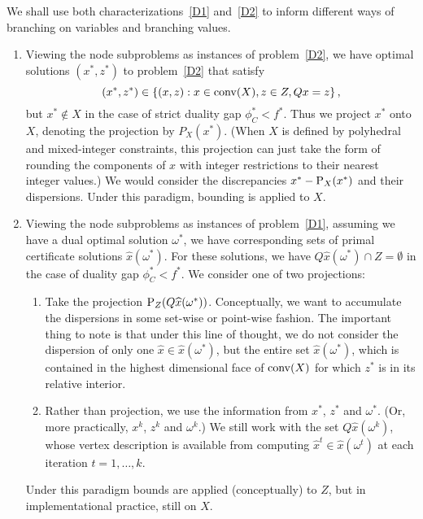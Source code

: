 We shall use both characterizations~\eqref{D1} and~\eqref{D2} to inform different ways of branching on variables and branching values. 
\begin{enumerate}
\item Viewing the node subproblems as instances of problem~\eqref{D2}, we have optimal solutions $(x^*,z^*)$ to problem~\eqref{D2} that satisfy 
$$(x^*,z^*) \in \left\{ (x,z) : x \in \operatorname{conv}(X), z \in Z, Qx=z \right \},$$ 
but $x^* \not\in X$ in the case of strict duality gap $\phi_C^* < f^*$. Thus we project $x^*$ onto $X$, denoting the projection by $P_X(x^*)$. (When $X$ is defined by polyhedral and mixed-integer constraints, this projection can just take the form of rounding the components of $x$ with integer restrictions to their nearest integer values.) We would consider the discrepancies $x^* - \text{P}_X(x^*)$ and their dispersions. Under this paradigm, bounding is applied to $X$.
\item Viewing the node subproblems as instances of problem~\eqref{D1}, assuming we have a dual optimal solution $\omega^*$, we have corresponding sets of primal certificate solutions $\widehat{x}(\omega^*)$. For these solutions, we have $Q\widehat{x}(\omega^*) \cap  Z = \emptyset$ in the case of duality gap $\phi_C^* < f^*$. We consider one of two projections:
\begin{enumerate}
\item Take the projection $\text{P}_Z(Q\widehat{x}(\omega^*))$. Conceptually, we want to accumulate the dispersions in some set-wise or point-wise fashion.
The important thing to note is that under this line of thought, we do not consider the dispersion of only one $\widehat{x} \in \widehat{x}(\omega^*)$, but the entire set $\widehat{x}(\omega^*)$, which is contained in the highest dimensional face of $\operatorname{conv}(X)$ for which $z^*$ is in its relative interior.
\item Rather than projection, we use the information from $x^*$, $z^*$ and $\omega^*$. (Or, more practically, $x^k$, $z^k$ and $\omega^k$.) We still work with the set $Q\widehat{x}(\omega^k)$, whose vertex description is available from computing $\widehat{x}^t \in \widehat{x}(\omega^t)$ at each iteration $t=1,\dots,k$.
\end{enumerate}
Under this paradigm bounds are applied (conceptually) to $Z$, but in implementational practice, still on $X$.
\end{enumerate}




